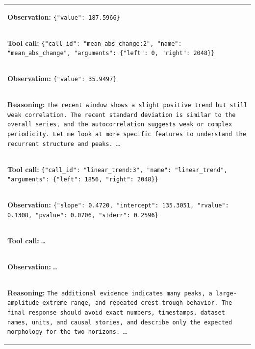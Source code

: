 \documentclass[11pt]{article}
\begin{document}
\begin{table}[t]
\begin{tabular}{p{}}
\colorbox{blue!10}{\parbox{0.95\textwidth}{%
\textbf{Observation:}
\texttt{\{"value": 187.5966\}}
}} \\

\hdashline

\colorbox{red!10}{\parbox{0.95\textwidth}{%
\textbf{Tool call:}
\texttt{\{"call\_id": "mean\_abs\_change:2", "name": "mean\_abs\_change",
"arguments": \{"left": 0, "right": 2048\}\}}
}} \\

\colorbox{blue!10}{\parbox{0.95\textwidth}{%
\textbf{Observation:}
\texttt{\{"value": 35.9497\}}
}} \\

\hdashline

\colorbox{green!10}{\parbox{0.95\textwidth}{%
\textbf{Reasoning:}
\texttt{The recent window shows a slight positive trend but still weak
correlation. The recent standard deviation is similar to the overall series,
and the autocorrelation suggests weak or complex periodicity. Let me look at
more specific features to understand the recurrent structure and peaks. \ldots}
}} \\

\hdashline

\colorbox{red!10}{\parbox{0.95\textwidth}{%
\textbf{Tool call:}
\texttt{\{"call\_id": "linear\_trend:3", "name": "linear\_trend",
"arguments": \{"left": 1856, "right": 2048\}\}}
}} \\

\colorbox{blue!10}{\parbox{0.95\textwidth}{%
\textbf{Observation:}
\texttt{\{"slope": 0.4720, "intercept": 135.3051, "rvalue": 0.1308,
"pvalue": 0.0706, "stderr": 0.2596\}}
}} \\

\hdashline

\colorbox{red!10}{\parbox{0.95\textwidth}{%
\textbf{Tool call:}
\texttt{\ldots}
}} \\

\colorbox{blue!10}{\parbox{0.95\textwidth}{%
\textbf{Observation:}
\texttt{\ldots}
}} \\

\hdashline

\colorbox{green!10}{\parbox{0.95\textwidth}{%
\textbf{Reasoning:}
\texttt{The additional evidence indicates many peaks, a large-amplitude
extreme range, and repeated crest--trough behavior. The final response should
avoid exact numbers, timestamps, dataset names, units, and causal stories, and
describe only the expected morphology for the two horizons. \ldots}
}} \\


\end{tabular}
\end{table}
\end{document}
